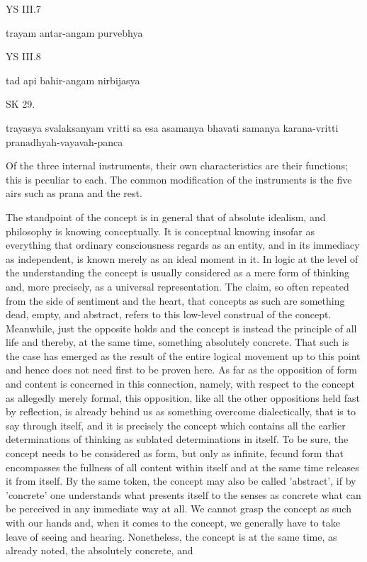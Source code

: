 YS III.7

trayam antar-angam purvebhya

YS III.8

tad api bahir-angam nirbijasya

SK 29.

trayasya svalaksanyam vritti sa esa asamanya bhavati
samanya karana-vritti pranadhyah-vayavah-panca

Of the three internal instruments, their own characteristics are their functions;
this is peculiar to each.
The common modification of the instruments is the five airs
such as prana and the rest.

The standpoint of the concept is in general that of absolute idealism,
and philosophy is knowing conceptually.
It is conceptual knowing insofar as everything that ordinary consciousness
regards as an entity, and in its immediacy as independent, is known merely as
an ideal moment in it.
In logic at the level of the understanding the concept is
usually considered as a mere form of thinking and,
more precisely, as a universal representation.
The claim, so often repeated from the side of sentiment and the heart,
that concepts as such are something dead, empty, and abstract, refers to
this low-level construal of the concept.
Meanwhile, just the opposite holds and the concept is instead the principle of
all life and thereby, at the same time, something absolutely concrete.
That such is the case has emerged as the result of the entire logical movement
up to this point and hence does not need first to be proven here.
As far as the opposition of form and content is concerned in this connection,
namely, with respect to the concept as allegedly merely formal,
this opposition, like all the other oppositions held fast by reflection, is already
behind us as something overcome dialectically, that is to say through itself, and it
is precisely the concept which contains all the earlier determinations of thinking as
sublated determinations in itself.
To be sure, the concept needs to be considered as form,
but only as infinite, fecund form that encompasses the fullness of all content
within itself and at the same time releases it from itself.
By the same token, the concept may also be called 'abstract',
if by 'concrete' one understands what presents itself to the senses as concrete
what can be perceived in any immediate way at all.
We cannot grasp the concept as such with our hands and, when it comes to
the concept, we generally have to take leave of seeing and hearing.
Nonetheless, the concept is at the same time, as already noted, the absolutely concrete, and
